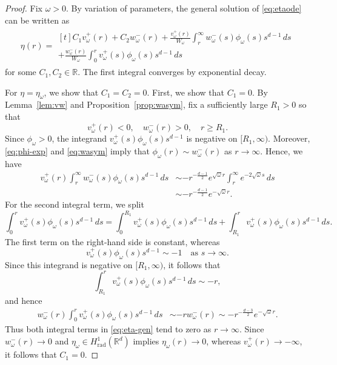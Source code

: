 \documentclass[12pt, a4paper, reqno]{amsart}
\numberwithin{equation}{section}
\theoremstyle{definition}
\theoremstyle{remark}
\newcommand{\R}{\mathbb R}
\newcommand{\rad}{\mathrm{rad}}
\begin{document}
\begin{proof}
Fix $\omega>0$. By variation of parameters, the general solution of
\eqref{eq:etaode} can be written as
\begin{align} \label{eq:eta-gen}
    \eta(r)
    =\begin{multlined}[t]
    C_1v_\omega^+(r)+C_2w_\omega^-(r)
    +\frac{v_\omega^+(r)}{W_\omega}
    \int_r^\infty w_\omega^-(s)\phi_\omega(s)s^{d-1}\,ds
\\  +\frac{w_\omega^-(r)}{W_\omega}
    \int_0^r v_\omega^+(s)\phi_\omega(s)s^{d-1}\,ds
    \end{multlined}
\end{align}
for some $C_1,C_2\in\R$. The first integral converges by exponential decay.

For $\eta=\eta_\omega$, we show that $C_1=C_2=0$.
First, we show that $C_1=0$. By Lemma~\ref{lem:vw} and
Proposition~\ref{prop:wasym}, fix a sufficiently large $R_1>0$ so that
\[
  v_\omega^+(r)<0,\quad w_\omega^-(r)>0,\quad r\ge R_1.
\]
Since $\phi_\omega>0$, the integrand
$v_\omega^+(s)\phi_\omega(s)s^{d-1}$ is negative on
$[R_1,\infty)$. 
Moreover, \eqref{eq:phi-exp} and \eqref{eq:wasym}
imply that
$\phi_\omega(r)\sim w_\omega^-(r)$ as $r\to\infty$.
Hence, we have
\begin{align*}
  v_\omega^+(r)
  \int_r^\infty w_\omega^-(s)\phi_\omega(s)s^{d-1}\,ds
  &\sim -r^{-\frac{d-1}{2}}e^{\sqrt{\omega}r}
       \int_r^\infty e^{-2\sqrt{\omega}s}\,ds
\\&\sim -r^{-\frac{d-1}{2}}e^{-\sqrt{\omega}r}.
\end{align*}
For the second integral term, we split
\[
  \int_0^r v_\omega^+(s)\phi_\omega(s)s^{d-1}\,ds
  =\int_0^{R_1}v_\omega^+(s)\phi_\omega(s)s^{d-1}\,ds
   +\int_{R_1}^r v_\omega^+(s)\phi_\omega(s)s^{d-1}\,ds.
\]
The first term on the right-hand side is constant, whereas
\[
  v_\omega^+(s)\phi_\omega(s)s^{d-1}\sim-1
  \quad\text{as }s\to\infty.
\]
Since this integrand is negative on $[R_1,\infty)$, it follows that
\[
  \int_{R_1}^r v_\omega^+(s)\phi_\omega(s)s^{d-1}\,ds\sim-r,
\]
and hence
\begin{align*}
  w_\omega^-(r)
  \int_0^r v_\omega^+(s)\phi_\omega(s)s^{d-1}\,ds
  &\sim-rw_\omega^-(r)
   \sim-r^{-\frac{d-3}{2}}e^{-\sqrt{\omega}r}.
\end{align*}
Thus both integral terms in \eqref{eq:eta-gen} tend to zero as
$r\to\infty$. Since $w_\omega^-(r)\to0$ and
$\eta_\omega\in H_{\rad}^1(\R^d)$ implies $\eta_\omega(r)\to0$,
whereas $v_\omega^+(r)\to-\infty$, it follows that $C_1=0$.


\end{proof}
\end{document}
